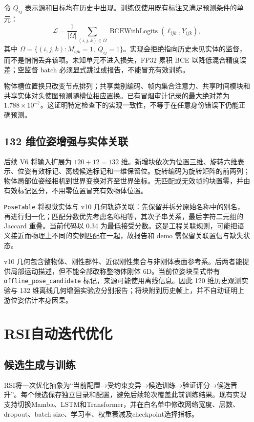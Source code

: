 \documentclass[10pt,twocolumn,letterpaper]{article}
\newcommand{\code}[1]{\texttt{\small #1}}
\begin{document}
令 $Q_{ij}$ 表示源和目标均在历史中出现。训练仅使用既有标注又满足预测条件的单元：
\begin{equation}
 \mathcal L=\frac{1}{|\Omega|}
 \sum_{(i,j,k)\in\Omega}
 \operatorname{BCEWithLogits}(\ell_{ijk},Y_{ijk}),
\end{equation}
其中 $\Omega=\{(i,j,k):M_{ijk}=1,\ Q_{ij}=1\}$。实现会拒绝指向历史未见实体的监督，而不是悄悄丢弃该项。未知单元不进入损失，FP32 累积 BCE 以降低混合精度误差；空监督 batch 必须显式跳过或报告，不能冒充有效训练。

物体槽位置换只改变节点排列；共享类别编码、帧内集合注意力、共享时间模块和共享实体对头使图预测随槽位相应置换。已有冒烟审计记录的最大绝对差为 $1.788\times10^{-7}$。这证明特定检查下的实现一致性，不等于在任意身份错误下仍能正确预测。


\subsection{132 维位姿增强与实体关联}
后续 V6 将输入扩展为 $120+12=132$ 维。新增块依次为位置三维、旋转六维表示、位姿有效标记、离线候选标记和一维保留位。旋转编码为旋转矩阵的前两列；物体局部位姿经相机到世界变换对齐至世界坐标。无匹配或无效帧的块置零，并由有效标记区分，不用零位置冒充有效物体位置。

\code{PoseTable} 将视觉实体与 v10 几何轨迹关联：先保留并拆分原始名称中的别名，再进行归一化；匹配分数优先考虑名称相等，其次子串关系，最后字符二元组的 Jaccard 重叠。当前代码以 0.34 为最低接受分数。这是工程关联规则，可能把语义接近而物理上不同的实例匹配在一起，故报告和 demo 需保留关联置信与缺失状态。

v10 几何包含整物体、刚性部件、近似刚性集合与非刚体表面参考系。后两者能提供局部运动描述，但不能全部改称整物体刚体 6D。当前位姿块显式带有 \code{offline\_pose\_candidate} 标记，来源可能使用离线信息。因此 120 维历史观测实验与 132 维离线几何增强实验应分别报告；将块附到历史帧上，并不自动证明上游位姿估计本身因果。

\section{RSI自动迭代优化}
\subsection{候选生成与训练}
RSI将一次优化抽象为“当前配置→受约束变异→候选训练→验证评分→候选晋升”。每个候选保存独立目录和配置，避免后续轮次覆盖此前训练结果。现有实现支持切换Mamba、LSTM和Transformer，并在白名单中修改网络宽度、层数、dropout、batch size、学习率、权重衰减及checkpoint选择指标。
\end{document}
